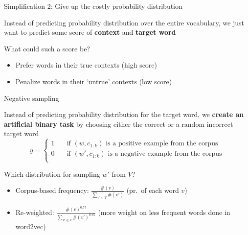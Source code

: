 \documentclass[12pt,aspectratio=169,handout]{beamer}
\begin{document}
\begin{frame}{Simplification 2: Give up the costly probability distribution}

Instead of predicting probability distribution over the entire vocabulary, we just want to predict some score of \textbf{context} and \textbf{target word}

What could such a score be?

\pause

\begin{itemize}
	\item Prefer words in their true contexts (high score)
	\pause
	\item Penalize words in their `untrue' contexts (low score)
\end{itemize}

\end{frame}


\begin{frame}{Negative sampling}
	
Instead of predicting probability distribution for the target word, we \textbf{create an artificial binary task} by choosing either the correct or a random incorrect target word \pause
$$
y = 
 \begin{cases}
	1  & \quad \text{if } (w, c_{1:k}) \text{ is a positive example from the corpus}\\
	0  & \quad \text{if } (w', c_{1:k}) \text{ is a negative example from the corpus}\\
\end{cases}
$$

\pause
Which distribution for sampling $w'$ from $V$?
\begin{itemize}
	\item Corpus-based frequency: $\frac{\#(v)}{\sum_{v' \in V} \#(v')}$ (pr.\ of each word $v$)
	\item Re-weighted: $\frac{\#(v)^{0.75}}{\sum_{v' \in V} \#(v')^{0.75}}$ (more weight on less frequent words done in word2vec)
\end{itemize}
	
\end{frame}
\end{document}
